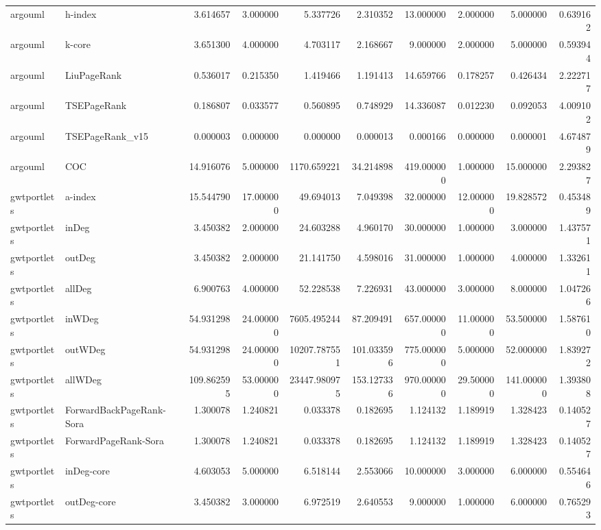 \begin{tabular}{llrrrrrrrr}
argouml & h-index & 3.614657 & 3.000000 & 5.337726 & 2.310352 & 13.000000 & 2.000000 & 5.000000 & 0.639162 \\
argouml & k-core & 3.651300 & 4.000000 & 4.703117 & 2.168667 & 9.000000 & 2.000000 & 5.000000 & 0.593944 \\
argouml & LiuPageRank & 0.536017 & 0.215350 & 1.419466 & 1.191413 & 14.659766 & 0.178257 & 0.426434 & 2.222717 \\
argouml & TSEPageRank & 0.186807 & 0.033577 & 0.560895 & 0.748929 & 14.336087 & 0.012230 & 0.092053 & 4.009102 \\
argouml & TSEPageRank_v15 & 0.000003 & 0.000000 & 0.000000 & 0.000013 & 0.000166 & 0.000000 & 0.000001 & 4.674879 \\
argouml & COC & 14.916076 & 5.000000 & 1170.659221 & 34.214898 & 419.000000 & 1.000000 & 15.000000 & 2.293827 \\
gwtportlets & a-index & 15.544790 & 17.000000 & 49.694013 & 7.049398 & 32.000000 & 12.000000 & 19.828572 & 0.453489 \\
gwtportlets & inDeg & 3.450382 & 2.000000 & 24.603288 & 4.960170 & 30.000000 & 1.000000 & 3.000000 & 1.437571 \\
gwtportlets & outDeg & 3.450382 & 2.000000 & 21.141750 & 4.598016 & 31.000000 & 1.000000 & 4.000000 & 1.332611 \\
gwtportlets & allDeg & 6.900763 & 4.000000 & 52.228538 & 7.226931 & 43.000000 & 3.000000 & 8.000000 & 1.047266 \\
gwtportlets & inWDeg & 54.931298 & 24.000000 & 7605.495244 & 87.209491 & 657.000000 & 11.000000 & 53.500000 & 1.587610 \\
gwtportlets & outWDeg & 54.931298 & 24.000000 & 10207.787551 & 101.033596 & 775.000000 & 5.000000 & 52.000000 & 1.839272 \\
gwtportlets & allWDeg & 109.862595 & 53.000000 & 23447.980975 & 153.127336 & 970.000000 & 29.500000 & 141.000000 & 1.393808 \\
gwtportlets & ForwardBackPageRank-Sora & 1.300078 & 1.240821 & 0.033378 & 0.182695 & 1.124132 & 1.189919 & 1.328423 & 0.140527 \\
gwtportlets & ForwardPageRank-Sora & 1.300078 & 1.240821 & 0.033378 & 0.182695 & 1.124132 & 1.189919 & 1.328423 & 0.140527 \\
gwtportlets & inDeg-core & 4.603053 & 5.000000 & 6.518144 & 2.553066 & 10.000000 & 3.000000 & 6.000000 & 0.554646 \\
gwtportlets & outDeg-core & 3.450382 & 3.000000 & 6.972519 & 2.640553 & 9.000000 & 1.000000 & 6.000000 & 0.765293 \\

\end{tabular}
